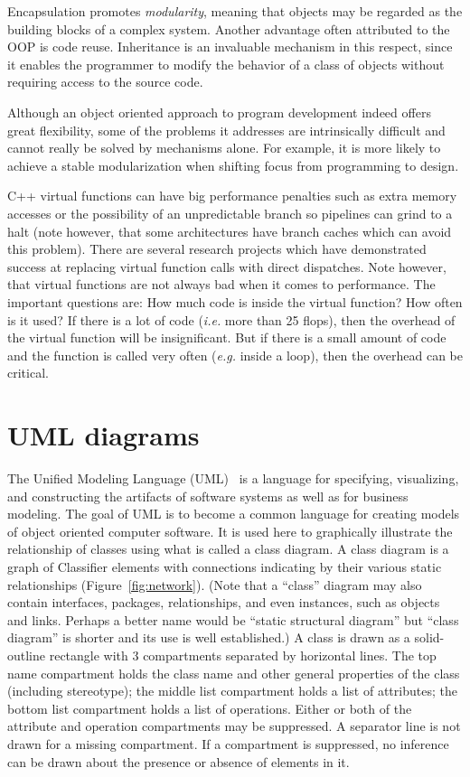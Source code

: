 Encapsulation promotes \emph{modularity}, meaning that objects may be
regarded as the building blocks of a complex system. Another advantage
often attributed to the OOP is code reuse. Inheritance is an invaluable
mechanism in this respect, since it enables the programmer to modify
the behavior of a class of objects without requiring access to the
source code.

Although an object oriented approach to program development indeed
offers great flexibility, some of the problems it addresses are
intrinsically difficult and cannot really be solved by mechanisms
alone. For example, it is more likely to achieve a stable
modularization when shifting focus from programming to design.

C++ virtual functions \cite{todd} can have big performance penalties
such as extra memory accesses or the possibility of an unpredictable
branch so pipelines can grind to a halt (note however, that some
architectures have branch caches which can avoid this problem). There
are several research projects which have demonstrated success at
replacing virtual function calls with direct dispatches. Note however,
that virtual functions are not always bad when it comes to
performance. The important questions are: How much code is inside the
virtual function? How often is it used? If there is a lot of code
(\emph{i.e.} more than 25 flops), then the overhead of the virtual
function will be insignificant. But if there is a small amount of code
and the function is called very often (\emph{e.g.}  inside a loop),
then the overhead can be critical.


\section{UML diagrams}

The Unified Modeling Language (UML)~\cite{rational,uml_tut} is a
language for specifying, visualizing, and constructing the artifacts
of software systems as well as for business modeling. The goal of UML
is to become a common language for creating models of object oriented
computer software.  It is used here to graphically illustrate the
relationship of classes using what is called a class diagram.  A class
diagram is a graph of Classifier elements with connections indicating
by their various static relationships (Figure~\ref{fig:network}). (Note
that a ``class'' diagram may also contain interfaces, packages,
relationships, and even instances, such as objects and links. Perhaps
a better name would be ``static structural diagram'' but ``class
diagram'' is shorter and its use is well established.)  A class is
drawn as a solid-outline rectangle with 3 compartments separated by
horizontal lines. The top name compartment holds the class name and
other general properties of the class (including stereotype); the
middle list compartment holds a list of attributes; the bottom list
compartment holds a list of operations.  Either or both of the
attribute and operation compartments may be suppressed. A separator
line is not drawn for a missing compartment. If a compartment is
suppressed, no inference can be drawn about the presence or absence of
elements in it.

